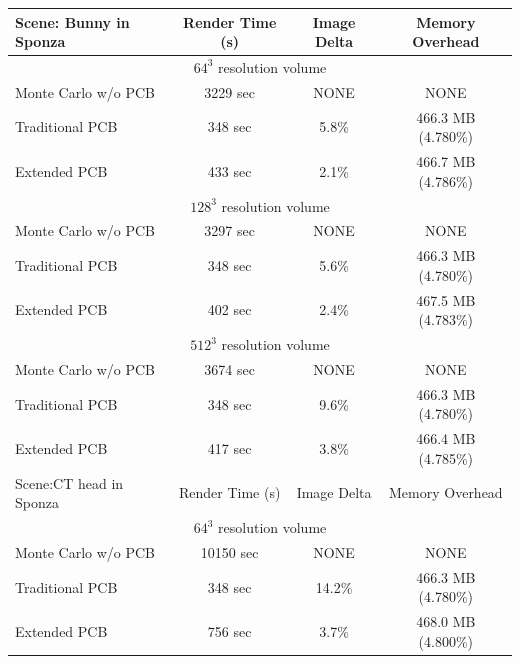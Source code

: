 \documentclass[runningheads]{llncs}
\begin{document}
\begin{table}
\begin{center}
\begin{tabular}{ | l | c | c | c | }
  \hline                       
  Scene: Bunny in Sponza & Render Time (s) & Image Delta & Memory Overhead \\

  \hline
  \multicolumn{4}{|c|}{$64^3$ resolution volume} \\     
  \hline            

  Monte Carlo w/o PCB & 3229 sec & NONE & NONE \\
  Traditional PCB & 348 sec & 5.8\% & 466.3 MB (4.780\%) \\
  Extended PCB & 433 sec & 2.1\% & 466.7 MB (4.786\%)  \\

  \hline
  \multicolumn{4}{|c|}{$128^3$ resolution volume} \\     
  \hline            
             
  Monte Carlo w/o PCB & 3297 sec & NONE & NONE \\
  Traditional PCB & 348 sec & 5.6\% & 466.3 MB (4.780\%) \\
  Extended PCB & 402 sec & 2.4\% & 467.5 MB (4.783\%)  \\

  \hline
  \multicolumn{4}{|c|}{$512^3$ resolution volume} \\     
  \hline            
             
  Monte Carlo w/o PCB & 3674 sec & NONE & NONE \\
  Traditional PCB & 348 sec & 9.6\% & 466.3 MB (4.780\%) \\
  Extended PCB & 417 sec & 3.8\% & 466.4 MB (4.785\%)  \\
  \hline  
  \hline  
             
  Scene:CT head in Sponza & Render Time (s) & Image Delta & Memory Overhead \\

  \hline
  \multicolumn{4}{|c|}{$64^3$ resolution volume} \\     
  \hline            

  Monte Carlo w/o PCB & 10150 sec & NONE & NONE \\
  Traditional PCB & 348 sec & 14.2\% & 466.3 MB (4.780\%) \\
  Extended PCB & 756 sec & 3.7\% & 468.0 MB (4.800\%)  \\


\end{tabular}
\end{center}
\end{table}
\end{document}
